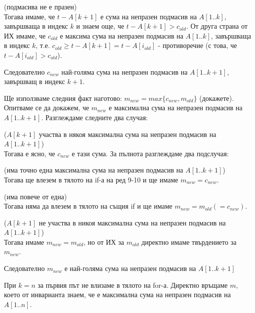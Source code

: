 \begin{maintenance}
\begin{itemize}
\begin{mycase}
			\item (подмасива не е празен)\\
			Тогава имаме, че $t-A[k+1]$ е сума на непразен подмасив на $A[1..k]$, завършваща в индекс $k$ и знаем още, че $t-A[k+1]>c_{old}$. От друга страна от ИХ имаме, че $c_{old}$ е максима сума на непразен подмасив на $A[1..k]$, завършваща в индекс $k$, т.е. $c_{old}\ge t-A[k+1]=t-A[i_{old}]$ - противоречие (с това, че $t-A[i_{old}]>c_{old}$).
		\end{mycase}
		Следователно $c_{new}$ най-голяма сума на непразен подмасив на $A[1..k+1]$, завършващ в индекс $k+1$.
		
		\item Ще използваме следния факт наготово: $m_{new}=max\{c_{new},m_{old}\}$ (докажете). Опитваме се да докажем, че $m_{new}$ е максимална сума на непразен подмасив на $A[1..k+1]$. Разглеждаме следните два случая:
		
			\item ($A[k+1]$ не участва в никоя максимална сума на непразен подмасив на $A[1..k+1]$)\\
			Тогава имаме $m_{new}=m_{old}$, но от ИХ за $m_{old}$ директно имаме твърдението за $m_{new}$.
		\end{mycase}
		Следователно $m_{new}$ е най-голяма сума на непразен подмасив на $A[1..k+1]$
	\end{itemize}
\end{maintenance}

\begin{termination}
	При $k=n$ за първия път не влизаме в тялото на for-а. Директно връщаме $m$, което от инварианта знаем, че е максимална сума на непразен подмасив на $A[1..n]$.
\end{termination}\leavevmode\newline\newline

